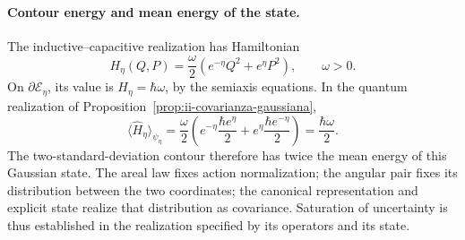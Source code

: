 \paragraph{Contour energy and mean energy of the state.}
The inductive--capacitive realization has Hamiltonian
\[
 H_\eta(Q,P)=\frac{\omega}{2}
 \left(e^{-\eta}Q^2+e^\eta P^2\right),\qquad \omega>0.
\]
On \(\partial\mathcal E_\eta\), its value is
\(H_\eta=\hbar\omega\), by the semiaxis equations. In the
quantum realization of Proposition~\ref{prop:ii-covarianza-gaussiana},
\begin{equation}
 \langle\widehat H_\eta\rangle_{\psi_\eta}
 =\frac{\omega}{2}
 \left(e^{-\eta}\frac{\hbar e^\eta}{2}
       +e^\eta\frac{\hbar e^{-\eta}}{2}\right)
 =\frac{\hbar\omega}{2}.
 \label{eq:ii-energia-contorno-covarianza}
\end{equation}
The two-standard-deviation contour therefore has twice the
mean energy of this Gaussian state. The areal law fixes action
normalization; the angular pair fixes its distribution between the two coordinates;
the canonical representation and explicit state realize that distribution
as covariance. Saturation of uncertainty is thus established in
the realization specified by its operators and its state.
